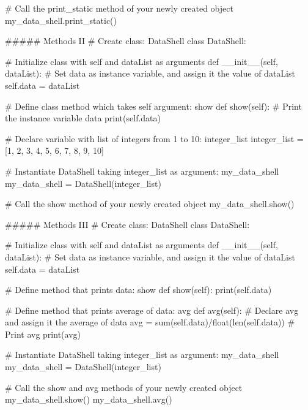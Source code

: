 # Call the print_static method of your newly created object
my_data_shell.print_static()


##### Methods II
# Create class: DataShell
class DataShell:
  
	# Initialize class with self and dataList as arguments
    def __init__(self, dataList):
      	# Set data as instance variable, and assign it the value of dataList
        self.data = dataList
        
	# Define class method which takes self argument: show
    def show(self):
        # Print the instance variable data
        print(self.data)

# Declare variable with list of integers from 1 to 10: integer_list
integer_list = [1, 2, 3, 4, 5, 6, 7, 8, 9, 10]
        
# Instantiate DataShell taking integer_list as argument: my_data_shell
my_data_shell = DataShell(integer_list)

# Call the show method of your newly created object
my_data_shell.show()


##### Methods III
# Create class: DataShell
class DataShell:
  
	# Initialize class with self and dataList as arguments
    def __init__(self, dataList):
      	# Set data as instance variable, and assign it the value of dataList
        self.data = dataList
        
	# Define method that prints data: show
    def show(self):
        print(self.data)
        
    # Define method that prints average of data: avg 
    def avg(self):
        # Declare avg and assign it the average of data
        avg = sum(self.data)/float(len(self.data))
        # Print avg
        print(avg)
        
# Instantiate DataShell taking integer_list as argument: my_data_shell
my_data_shell = DataShell(integer_list)

# Call the show and avg methods of your newly created object
my_data_shell.show()
my_data_shell.avg()


